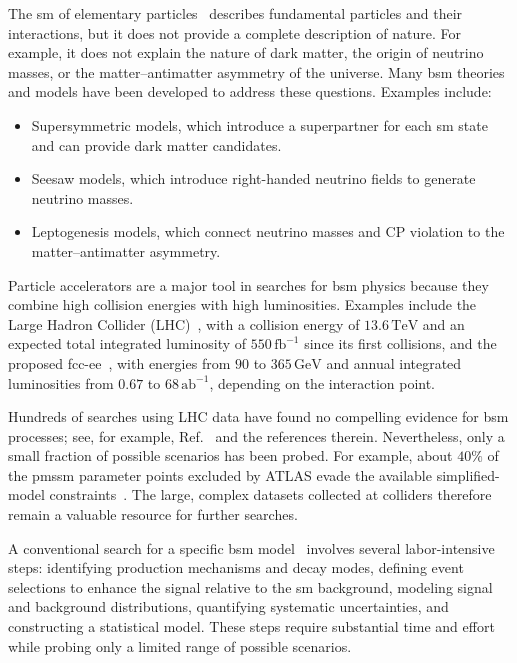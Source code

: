 The \gls{sm} of elementary particles~\cite{Grossman_StandardModel_2023} describes fundamental particles and their interactions, but it does not provide a complete description of nature. For example, it does not explain the nature of dark matter, the origin of neutrino masses, or the matter--antimatter asymmetry of the universe. Many \gls{bsm} theories and models have been developed to address these questions. Examples include:

\begin{itemize}
    \item Supersymmetric models, which introduce a superpartner for each \gls{sm} state and can provide dark matter candidates.
    \item Seesaw models, which introduce right-handed neutrino fields to generate neutrino masses.
    \item Leptogenesis models, which connect neutrino masses and CP violation to the matter--antimatter asymmetry.
\end{itemize}

Particle accelerators are a major tool in searches for \gls{bsm} physics because they combine high collision energies with high luminosities. Examples include the Large Hadron Collider (LHC)~\cite{CERN_Courier_LHC_Run3}, with a collision energy of $13.6\,\mathrm{TeV}$ and an expected total integrated luminosity of $550\,\mathrm{fb}^{-1}$ since its first collisions, and the proposed \gls{fcc-ee}~\cite{Benedikt_2026_FCC}, with energies from $90$ to $365\,\mathrm{GeV}$ and annual integrated luminosities from $0.67$ to $68\,\mathrm{ab}^{-1}$, depending on the interaction point.

Hundreds of searches using LHC data have found no compelling evidence for \gls{bsm} processes; see, for example, Ref.~\cite{PDG_2024} and the references therein. Nevertheless, only a small fraction of possible scenarios has been probed. For example, about $40\%$ of the \gls{pmssm} parameter points excluded by ATLAS evade the available simplified-model constraints~\cite{Ambrogi_2018_pMSSM_misses}. The large, complex datasets collected at colliders therefore remain a valuable resource for further searches.

A conventional search for a specific \gls{bsm} model~\cite{ATLAS_Higgs_2012} involves several labor-intensive steps: identifying production mechanisms and decay modes, defining event selections to enhance the signal relative to the \gls{sm} background, modeling signal and background distributions, quantifying systematic uncertainties, and constructing a statistical model. These steps require substantial time and effort while probing only a limited range of possible scenarios.

